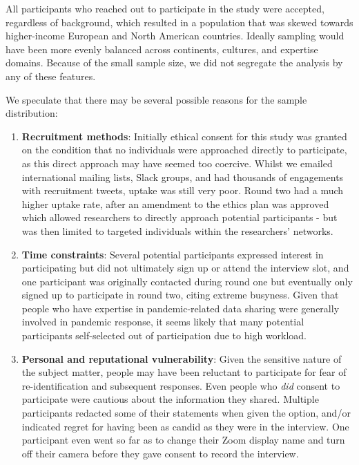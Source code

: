 \documentclass{CUP-JNL-DAP}%
\begin{document}
All participants who reached out to participate in the study were accepted, regardless of background, which resulted in a population that was skewed towards higher-income European and North American countries. Ideally sampling would have been more evenly balanced across continents, cultures, and expertise domains. Because of the small sample size, we did not segregate the analysis by any of these features. 

We speculate that there may be several possible reasons for the sample distribution:

\begin{enumerate}
\item \textbf{Recruitment methods}: Initially ethical consent for this study was granted on the condition that no individuals were approached directly to participate, as this direct approach may have seemed too coercive. Whilst we emailed international mailing lists, Slack groups, and had thousands of engagements with recruitment tweets, uptake was still very poor. Round two had a much higher uptake rate, after an amendment to the ethics plan was approved which allowed researchers to directly approach potential participants - but was then limited to targeted individuals within the researchers' networks. 
\item \textbf{Time constraints}: Several potential participants expressed interest in participating but did not ultimately sign up or attend the interview slot, and one participant was originally contacted during round one but eventually only signed up to participate in round two, citing extreme busyness. Given that people who have expertise in pandemic-related data sharing were generally involved in pandemic response, it seems likely that many potential participants self-selected out of participation due to high workload.
\item \textbf{Personal and reputational vulnerability}: Given the sensitive nature of the subject matter, people may have been reluctant to participate for fear of re-identification and subsequent responses. Even people who \textit{did} consent to participate were cautious about the information they shared. Multiple participants redacted some of their statements when given the option, and/or indicated regret for having been as candid as they were in the interview. One participant even went so far as to change their Zoom display name and turn off their camera before they gave consent to record the interview. 
\end{enumerate}
\end{document}

